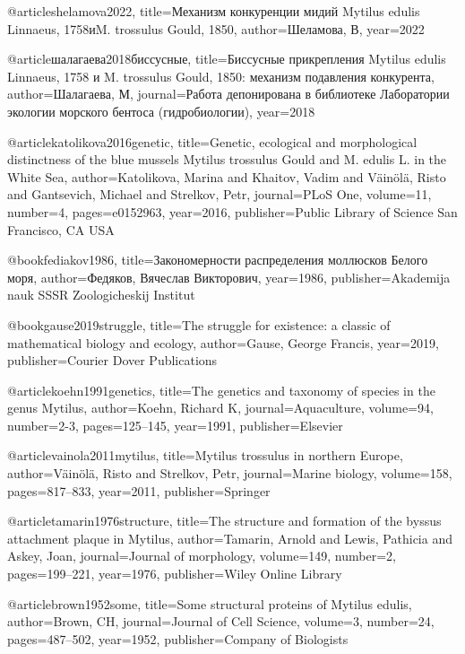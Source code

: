 @article{shelamova2022,
  title={Механизм конкуренции мидий Mytilus edulis Linnaeus, 1758иM. trossulus Gould, 1850},
  author={Шеламова, В}, 
year={2022}
}

@article{шалагаева2018биссусные,
  title={Биссусные прикрепления Mytilus edulis Linnaeus, 1758 и M. trossulus Gould, 1850: механизм подавления конкурента},
  author={Шалагаева, М},
  journal={Работа депонирована в библиотеке Лаборатории экологии морского бентоса (гидробиологии)},
  year={2018}
}

@article{katolikova2016genetic,
  title={Genetic, ecological and morphological distinctness of the blue mussels Mytilus trossulus Gould and M. edulis L. in the White Sea},
  author={Katolikova, Marina and Khaitov, Vadim and V{\"a}in{\"o}l{\"a}, Risto and Gantsevich, Michael and Strelkov, Petr},
  journal={PLoS One},
  volume={11},
  number={4},
  pages={e0152963},
  year={2016},
  publisher={Public Library of Science San Francisco, CA USA}
}

@book{fediakov1986,
  title={Закономерности распределения моллюсков Белого моря},
  author={Федяков, Вячеслав Викторович},
  year={1986},
  publisher={Akademija nauk SSSR Zoologicheskij Institut}
}

@book{gause2019struggle,
  title={The struggle for existence: a classic of mathematical biology and ecology},
  author={Gause, George Francis},
  year={2019},
  publisher={Courier Dover Publications}
}

@article{koehn1991genetics,
  title={The genetics and taxonomy of species in the genus Mytilus},
  author={Koehn, Richard K},
  journal={Aquaculture},
  volume={94},
  number={2-3},
  pages={125--145},
  year={1991},
  publisher={Elsevier}
}

@article{vainola2011mytilus,
  title={Mytilus trossulus in northern Europe},
  author={V{\"a}in{\"o}l{\"a}, Risto and Strelkov, Petr},
  journal={Marine biology},
  volume={158},
  pages={817--833},
  year={2011},
  publisher={Springer}
}

@article{tamarin1976structure,
  title={The structure and formation of the byssus attachment plaque in Mytilus},
  author={Tamarin, Arnold and Lewis, Pathicia and Askey, Joan},
  journal={Journal of morphology},
  volume={149},
  number={2},
  pages={199--221},
  year={1976},
  publisher={Wiley Online Library}
}

@article{brown1952some,
  title={Some structural proteins of Mytilus edulis},
  author={Brown, CH},
  journal={Journal of Cell Science},
  volume={3},
  number={24},
  pages={487--502},
  year={1952},
  publisher={Company of Biologists}
}

